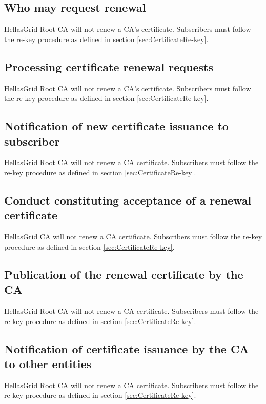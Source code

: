\documentclass[11pt,a4paper,titlepage]{book}
\begin{document}
\subsection{Who may request renewal}


HellasGrid Root CA will not renew a CA’s certificate. Subscribers must follow the re-key procedure as defined in section \ref{sec:CertificateRe-key}.

\subsection{Processing certificate renewal requests}

HellasGrid Root CA will not renew a CA’s certificate. Subscribers must follow the re-key procedure as defined in section \ref{sec:CertificateRe-key}.

\subsection{Notification of new certificate issuance to subscriber}

HellasGrid Root CA will not renew a CA certificate. Subscribers must follow the re-key procedure as defined in section \ref{sec:CertificateRe-key}.

\subsection{Conduct constituting acceptance of a renewal certificate}

HellasGrid CA will not renew a CA certificate. Subscribers must follow the re-key procedure as defined in section \ref{sec:CertificateRe-key}.


\subsection{Publication of the renewal certificate by the CA}

HellasGrid Root CA will not renew a CA certificate. Subscribers must follow the re-key procedure as defined in section \ref{sec:CertificateRe-key}.

\subsection{Notification of certificate issuance by the CA to other entities}

HellasGrid Root CA will not renew a CA certificate. Subscribers must follow the re-key procedure as defined in section \ref{sec:CertificateRe-key}.
\end{document}

